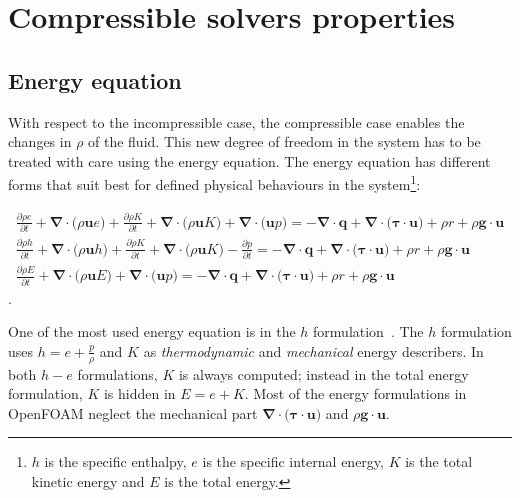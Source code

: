 \section{Compressible solvers properties} \label{app:app2}
\subsection{Energy equation}
With respect to the incompressible case, the compressible case enables the changes in $\rho$ of the fluid. This new degree of freedom in the system has to be treated with care using the energy equation. The energy equation has different forms that suit best for defined physical behaviours in the system\footnote{$h$ is the specific enthalpy, $e$ is the specific internal energy, $K$ is the total kinetic energy and $E$ is the total energy.}:

{\small
\begin{align} 
    \frac{\partial \rho e}{\partial t} + \boldsymbol{\nabla} \cdot \big( \rho \boldsymbol{u} e \big) + \frac{\partial \rho K}{\partial t} + \boldsymbol{\nabla} \cdot \big( \rho \boldsymbol{u} K \big) + \boldsymbol{\nabla} \cdot \big( \boldsymbol{u} p \big) = - \boldsymbol{\nabla} \cdot \boldsymbol{q} + \boldsymbol{\nabla} \cdot \big( \boldsymbol{\tau} \cdot \boldsymbol{u} \big) + \rho r + \rho \boldsymbol{g} \cdot \boldsymbol{u} \label{eqn:heqn} \\  
    \frac{\partial \rho h}{\partial t} + \boldsymbol{\nabla} \cdot \big( \rho \boldsymbol{u} h \big) + \frac{\partial \rho K}{\partial t} + \boldsymbol{\nabla} \cdot \big( \rho \boldsymbol{u} K \big) - \frac{\partial p}{\partial t} = - \boldsymbol{\nabla} \cdot \boldsymbol{q} + \boldsymbol{\nabla} \cdot \big( \boldsymbol{\tau} \cdot \boldsymbol{u} \big) + \rho r + \rho \boldsymbol{g} \cdot \boldsymbol{u} \label{eqn:eeqn} \\  
    \frac{\partial \rho E}{\partial t} + \boldsymbol{\nabla} \cdot \big( \rho \boldsymbol{u} E \big) + \boldsymbol{\nabla} \cdot \big( \boldsymbol{u} p \big) = - \boldsymbol{\nabla} \cdot \boldsymbol{q} + \boldsymbol{\nabla} \cdot \big( \boldsymbol{\tau} \cdot \boldsymbol{u} \big) + \rho r + \rho \boldsymbol{g} \cdot \boldsymbol{u} \label{eqn:Eeqn}  
\end{align}. 
}

One of the most used energy equation is in the $h$ formulation~\cite[Ch. 11]{ferziger2002computational}. The $h$ formulation uses $h = e + \frac{p}{\rho}$ and $K$ as \textit{thermodynamic} and \textit{mechanical} energy describers. In both $h - e$ formulations, $K$ is always computed; instead in the total energy formulation, $K$ is hidden in $E = e + K$. Most of the energy formulations in OpenFOAM neglect the mechanical part $\boldsymbol{\nabla} \cdot \big( \boldsymbol{\tau} \cdot \boldsymbol{u} \big)$ and $\rho \boldsymbol{g} \cdot \boldsymbol{u}$.  

